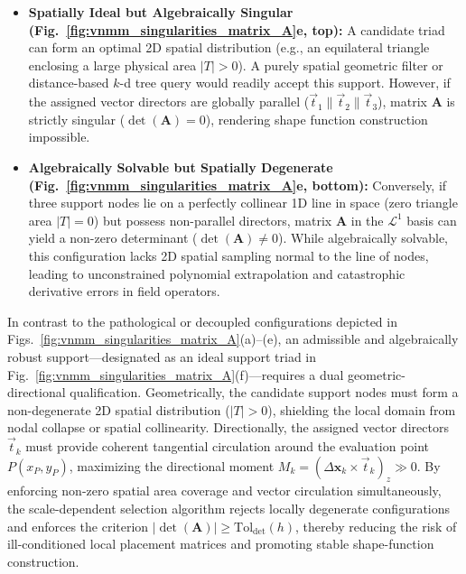 \documentclass[preprint,12pt]{elsarticle}
\begin{document}
\begin{itemize}
    \item \textbf{Spatially Ideal but Algebraically Singular (Fig.~\ref{fig:vnmm_singularities_matrix_A}e, top):} A candidate triad can form an optimal 2D spatial distribution (e.g., an equilateral triangle enclosing a large physical area $|T| > 0$). A purely spatial geometric filter or distance-based $k$-d tree query would readily accept this support. However, if the assigned vector directors are globally parallel ($\vec{t}_1 \parallel \vec{t}_2 \parallel \vec{t}_3$), matrix $\mathbf{A}$ is strictly singular ($\det(\mathbf{A}) = 0$), rendering shape function construction impossible.
    
    \item \textbf{Algebraically Solvable but Spatially Degenerate (Fig.~\ref{fig:vnmm_singularities_matrix_A}e, bottom):} Conversely, if three support nodes lie on a perfectly collinear 1D line in space (zero triangle area $|T| = 0$) but possess non-parallel directors, matrix $\mathbf{A}$ in the $\mathcal{L}^1$ basis can yield a non-zero determinant ($\det(\mathbf{A}) \neq 0$). While algebraically solvable, this configuration lacks 2D spatial sampling normal to the line of nodes, leading to unconstrained polynomial extrapolation and catastrophic derivative errors in field operators.
    
\end{itemize}
In contrast to the pathological or decoupled configurations depicted in Figs.~\ref{fig:vnmm_singularities_matrix_A}(a)--(e), an admissible and algebraically robust support---designated as an ideal support triad in Fig.~\ref{fig:vnmm_singularities_matrix_A}(f)---requires a dual geometric-directional qualification. Geometrically, the candidate support nodes must form a non-degenerate 2D spatial distribution ($|T| > 0$), shielding the local domain from nodal collapse or spatial collinearity. Directionally, the assigned vector directors $\vec{t}_k$ must provide coherent tangential circulation around the evaluation point $P(x_P, y_P)$, maximizing the directional moment $M_k = (\Delta\mathbf{x}_k \times \vec{t}_k)_z \gg 0$. By enforcing non-zero spatial area coverage and vector circulation simultaneously, the scale-dependent selection algorithm rejects locally degenerate configurations and enforces the criterion $|\det(\mathbf{A})| \ge \mathrm{Tol}_{\mathrm{det}}(h)$, thereby reducing the risk of ill-conditioned local placement matrices and promoting stable shape-function construction.

\end{document}
